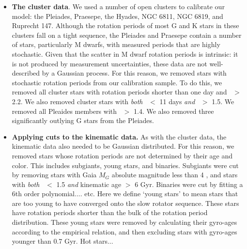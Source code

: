 \begin{itemize}
\item {\bf The cluster data}.
We used a number of open clusters to calibrate our model: the Pleiades,
        Praesepe, the Hyades, NGC 6811, NGC 6819, and Ruprecht 147.
Although the rotation periods of most G and K stars in these clusters fall on
a tight sequence, the Pleiades and Praesepe contain a number of stars,
        particularly M dwarfs, with measured periods that are highly
        stochastic.
Given that the scatter in M dwarf rotation periods is intrinsic: it is not
produced by measurement uncertainties, these data are not well-described by a
Gaussian process.
For this reason, we removed stars with stochastic rotation periods from our
calibration sample.
To do this, we removed all cluster stars with rotation periods shorter than
        one day and \gcolor\ $>$ 2.2.
We also removed cluster stars with {\it both} \prot\ $<$ 11 days {\it and}
\gcolor\ $>$ 1.5.
We removed all Pleaides members with \gcolor\ $>$ 1.4.
We also removed three significantly outlying G stars from the Pleiades.

\item {\bf Applying cuts to the kinematic data.}
As with the cluster data, the kinematic data also needed to be Gaussian
distributed.
For this reason, we removed stars whose rotation periods are not
determined by their age and color.
This includes subgiants, young stars, and binaries.
Subgiants were cut by removing stars with Gaia $M_G$ absolute magnitude less
than 4 , and stars with {\it both} \gcolor\ $<$ 1.5 {\it
and} kinematic age $>$ 6 Gyr.
Binaries were cut by fitting a 6th order polynomial.... etc.
Here we define `young stars' to mean stars that are too young to have
converged onto the slow rotator sequence.
These stars have rotation periods shorter than the bulk of the rotation period
distribution.
These young stars were removed by calculating their gyro-ages according to the
\citet{angus2019} empirical relation, and then excluding stars with gyro-ages
younger than 0.7 Gyr.
Hot stars...


\end{itemize}

